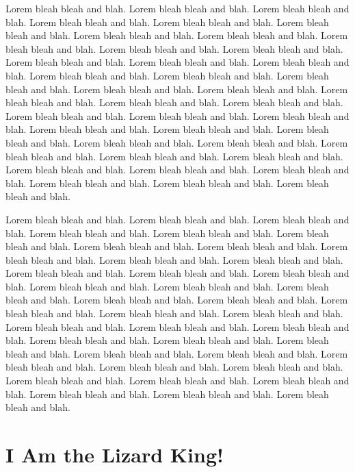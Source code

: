 \documentclass[letterpaper,10pt]{article}
\begin{document}
Lorem bleah bleah and blah. Lorem bleah bleah and blah. Lorem bleah
bleah and blah. Lorem bleah bleah and blah. Lorem bleah bleah and
blah. Lorem bleah bleah and blah. Lorem bleah bleah and blah. Lorem
bleah bleah and blah. Lorem bleah bleah and blah. Lorem bleah bleah
and blah. Lorem bleah bleah and blah. Lorem bleah bleah and blah.
Lorem bleah bleah and blah. Lorem bleah bleah and blah. Lorem bleah
bleah and blah. Lorem bleah bleah and blah. Lorem bleah bleah and
blah. Lorem bleah bleah and blah. Lorem bleah bleah and blah. Lorem
bleah bleah and blah. Lorem bleah bleah and blah. Lorem bleah bleah
and blah. Lorem bleah bleah and blah. Lorem bleah bleah and blah.
Lorem bleah bleah and blah. Lorem bleah bleah and blah. Lorem bleah
bleah and blah. Lorem bleah bleah and blah. Lorem bleah bleah and
blah. Lorem bleah bleah and blah. Lorem bleah bleah and blah. Lorem
bleah bleah and blah. Lorem bleah bleah and blah. Lorem bleah bleah
and blah. Lorem bleah bleah and blah. Lorem bleah bleah and blah.
Lorem bleah bleah and blah. Lorem bleah bleah and blah. Lorem bleah
bleah and blah.

Lorem bleah bleah and blah. Lorem bleah bleah and blah. Lorem bleah
bleah and blah. Lorem bleah bleah and blah. Lorem bleah bleah and
blah. Lorem bleah bleah and blah. Lorem bleah bleah and blah. Lorem
bleah bleah and blah. Lorem bleah bleah and blah. Lorem bleah bleah
and blah. Lorem bleah bleah and blah. Lorem bleah bleah and blah.
Lorem bleah bleah and blah. Lorem bleah bleah and blah. Lorem bleah
bleah and blah. Lorem bleah bleah and blah. Lorem bleah bleah and
blah. Lorem bleah bleah and blah. Lorem bleah bleah and blah. Lorem
bleah bleah and blah. Lorem bleah bleah and blah. Lorem bleah bleah
and blah. Lorem bleah bleah and blah. Lorem bleah bleah and blah.
Lorem bleah bleah and blah. Lorem bleah bleah and blah. Lorem bleah
bleah and blah. Lorem bleah bleah and blah. Lorem bleah bleah and
blah. Lorem bleah bleah and blah. Lorem bleah bleah and blah. Lorem
bleah bleah and blah. Lorem bleah bleah and blah. Lorem bleah bleah
and blah. Lorem bleah bleah and blah. Lorem bleah bleah and blah.
Lorem bleah bleah and blah. Lorem bleah bleah and blah. Lorem bleah
bleah and blah.

\section{I Am the Lizard King!}
\end{document}
